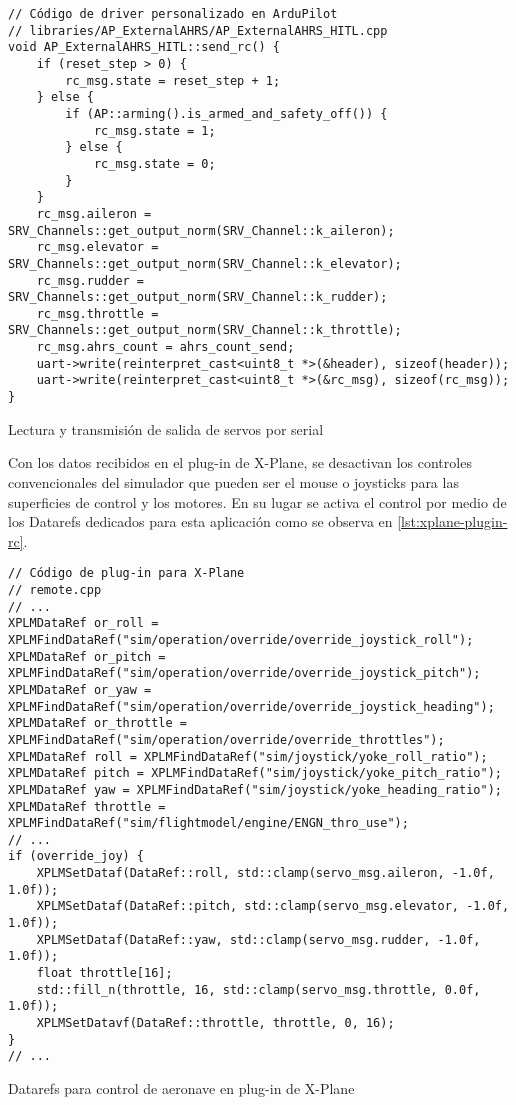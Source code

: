 \begin{listing}[h]
    \begin{verbatim}
// Código de driver personalizado en ArduPilot
// libraries/AP_ExternalAHRS/AP_ExternalAHRS_HITL.cpp
void AP_ExternalAHRS_HITL::send_rc() {
    if (reset_step > 0) {
        rc_msg.state = reset_step + 1;
    } else {
        if (AP::arming().is_armed_and_safety_off()) {
            rc_msg.state = 1;
        } else {
            rc_msg.state = 0;
        }
    }
    rc_msg.aileron = SRV_Channels::get_output_norm(SRV_Channel::k_aileron);
    rc_msg.elevator = SRV_Channels::get_output_norm(SRV_Channel::k_elevator);
    rc_msg.rudder = SRV_Channels::get_output_norm(SRV_Channel::k_rudder);
    rc_msg.throttle = SRV_Channels::get_output_norm(SRV_Channel::k_throttle);
    rc_msg.ahrs_count = ahrs_count_send;
    uart->write(reinterpret_cast<uint8_t *>(&header), sizeof(header));
    uart->write(reinterpret_cast<uint8_t *>(&rc_msg), sizeof(rc_msg));
}
    \end{verbatim}
    \caption{Lectura y transmisión de salida de servos por serial}
    \label{lst:hitl-rc}
\end{listing}

Con los datos recibidos en el plug-in de X-Plane, se desactivan los controles convencionales del simulador que pueden ser el mouse o joysticks para las superficies de control y los motores. En su lugar se activa el control por medio de los Datarefs dedicados para esta aplicación como se observa en \cref{lst:xplane-plugin-rc}.

\begin{listing}[h]
    \begin{verbatim}
// Código de plug-in para X-Plane
// remote.cpp
// ...
XPLMDataRef or_roll = XPLMFindDataRef("sim/operation/override/override_joystick_roll");
XPLMDataRef or_pitch = XPLMFindDataRef("sim/operation/override/override_joystick_pitch");
XPLMDataRef or_yaw = XPLMFindDataRef("sim/operation/override/override_joystick_heading");
XPLMDataRef or_throttle = XPLMFindDataRef("sim/operation/override/override_throttles");
XPLMDataRef roll = XPLMFindDataRef("sim/joystick/yoke_roll_ratio");
XPLMDataRef pitch = XPLMFindDataRef("sim/joystick/yoke_pitch_ratio");
XPLMDataRef yaw = XPLMFindDataRef("sim/joystick/yoke_heading_ratio");
XPLMDataRef throttle = XPLMFindDataRef("sim/flightmodel/engine/ENGN_thro_use");
// ...
if (override_joy) {
    XPLMSetDataf(DataRef::roll, std::clamp(servo_msg.aileron, -1.0f, 1.0f));
    XPLMSetDataf(DataRef::pitch, std::clamp(servo_msg.elevator, -1.0f, 1.0f));
    XPLMSetDataf(DataRef::yaw, std::clamp(servo_msg.rudder, -1.0f, 1.0f));
    float throttle[16];
    std::fill_n(throttle, 16, std::clamp(servo_msg.throttle, 0.0f, 1.0f));
    XPLMSetDatavf(DataRef::throttle, throttle, 0, 16);
}
// ...
    \end{verbatim}
    \caption{Datarefs para control de aeronave en plug-in de X-Plane}
    \label{lst:xplane-plugin-rc}
\end{listing}

